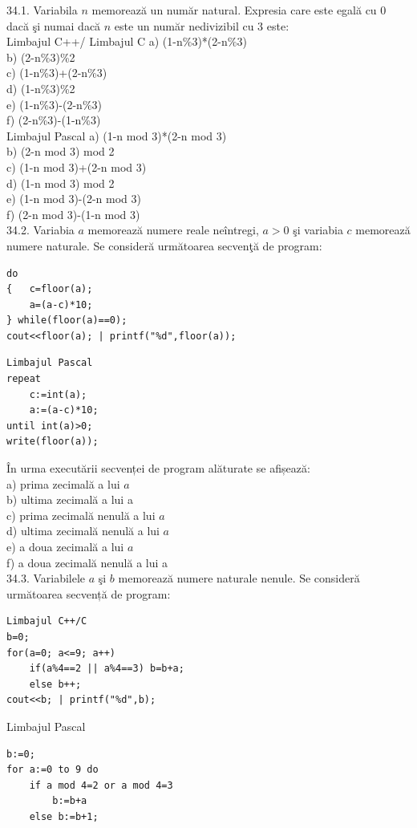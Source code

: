 \begin{itemize}
\begin{enumerate}
34.1. Variabila $n$ memorează un număr natural. Expresia care este egală cu 0 dacă şi numai dacă $n$ este un număr nedivizibil cu 3 este:
\\
Limbajul C++/ Limbajul C
a) (1-n\%3)*(2-n\%3)
\\
b) (2-n\%3)\%2
\\
c) (1-n\%3)+(2-n\%3)
\\
d) (1-n\%3)\%2
\\
e) (1-n\%3)-(2-n\%3)
\\
f) (2-n\%3)-(1-n\%3)
\\
Limbajul Pascal
a) (1-n mod 3)*(2-n mod 3)\\
b) (2-n mod 3) mod 2
\\
c) (1-n mod 3)+(2-n mod 3)
\\
d) (1-n mod 3) mod 2
\\
e) (1-n mod 3)-(2-n mod 3)
\\
f) (2-n mod 3)-(1-n mod 3)
\\
34.2. Variabia $a$ memorează numere reale neîntregi, $a>0$ şi variabia $c$ memorează numere naturale. Se consideră următoarea secvenţă de program:
\begin{verbatim}
do
{   c=floor(a);
    a=(a-c)*10;
} while(floor(a)==0);
cout<<floor(a); | printf("%d",floor(a));
\end{verbatim}
\begin{verbatim}
Limbajul Pascal
repeat
    c:=int(a);
    a:=(a-c)*10;
until int(a)>0;
write(floor(a));
\end{verbatim}
În urma executării secvenței de program alăturate se afișează:
\\
a) prima zecimală a lui $a$
\\
b) ultima zecimală a lui a
\\
c) prima zecimală nenulă a lui $a$
\\
d) ultima zecimală nenulă a lui $a$
\\
e) a doua zecimală a lui $a$
\\
f) a doua zecimală nenulă a lui a
\\
34.3. Variabilele $a$ şi $b$ memorează numere naturale nenule. Se consideră următoarea secvență de program:
\begin{verbatim}
Limbajul C++/C
b=0;
for(a=0; a<=9; a++)
    if(a%4==2 || a%4==3) b=b+a;
    else b++;
cout<<b; | printf("%d",b);
\end{verbatim}
Limbajul Pascal
\begin{verbatim}
b:=0;
for a:=0 to 9 do
    if a mod 4=2 or a mod 4=3 
        b:=b+a
    else b:=b+1;

\end{verbatim}
\end{enumerate}
\end{itemize}
